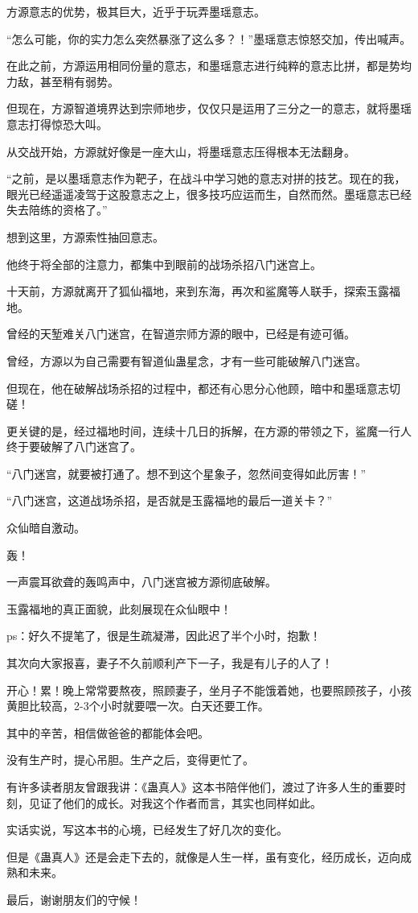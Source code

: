 \begin{this_body}
方源意志的优势，极其巨大，近乎于玩弄墨瑶意志。

“怎么可能，你的实力怎么突然暴涨了这么多？！”墨瑶意志惊怒交加，传出喊声。

在此之前，方源运用相同份量的意志，和墨瑶意志进行纯粹的意志比拼，都是势均力敌，甚至稍有弱势。

但现在，方源智道境界达到宗师地步，仅仅只是运用了三分之一的意志，就将墨瑶意志打得惊恐大叫。

从交战开始，方源就好像是一座大山，将墨瑶意志压得根本无法翻身。

“之前，是以墨瑶意志作为靶子，在战斗中学习她的意志对拼的技艺。现在的我，眼光已经遥遥凌驾于这股意志之上，很多技巧应运而生，自然而然。墨瑶意志已经失去陪练的资格了。”

想到这里，方源索性抽回意志。

他终于将全部的注意力，都集中到眼前的战场杀招八门迷宫上。

十天前，方源就离开了狐仙福地，来到东海，再次和鲨魔等人联手，探索玉露福地。

曾经的天堑难关八门迷宫，在智道宗师方源的眼中，已经是有迹可循。

曾经，方源以为自己需要有智道仙蛊星念，才有一些可能破解八门迷宫。

但现在，他在破解战场杀招的过程中，都还有心思分心他顾，暗中和墨瑶意志切磋！

更关键的是，经过福地时间，连续十几日的拆解，在方源的带领之下，鲨魔一行人终于要破解了八门迷宫了。

“八门迷宫，就要被打通了。想不到这个星象子，忽然间变得如此厉害！”

“八门迷宫，这道战场杀招，是否就是玉露福地的最后一道关卡？”

众仙暗自激动。

轰！

一声震耳欲聋的轰鸣声中，八门迷宫被方源彻底破解。

玉露福地的真正面貌，此刻展现在众仙眼中！

ps：好久不提笔了，很是生疏凝滞，因此迟了半个小时，抱歉！

其次向大家报喜，妻子不久前顺利产下一子，我是有儿子的人了！

开心！累！晚上常常要熬夜，照顾妻子，坐月子不能饿着她，也要照顾孩子，小孩黄胆比较高，2-3个小时就要喂一次。白天还要工作。

其中的辛苦，相信做爸爸的都能体会吧。

没有生产时，提心吊胆。生产之后，变得更忙了。

有许多读者朋友曾跟我讲：《蛊真人》这本书陪伴他们，渡过了许多人生的重要时刻，见证了他们的成长。对我这个作者而言，其实也同样如此。

实话实说，写这本书的心境，已经发生了好几次的变化。

但是《蛊真人》还是会走下去的，就像是人生一样，虽有变化，经历成长，迈向成熟和未来。

最后，谢谢朋友们的守候！

\end{this_body}

